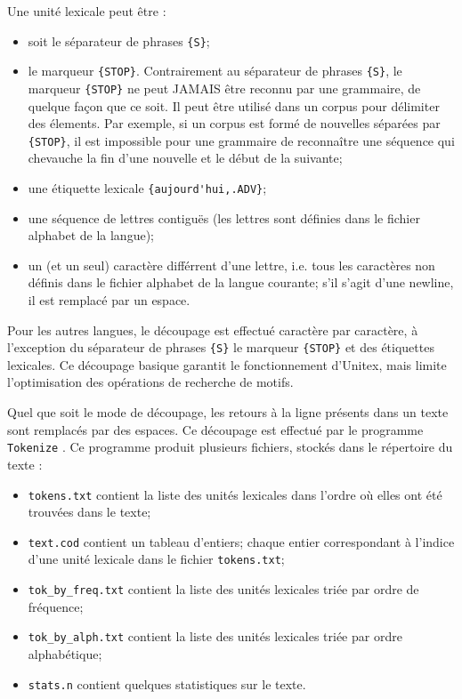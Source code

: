 \bigskip
\noindent Une unité lexicale peut être :
\begin{itemize}
  \item soit le séparateur de phrases \verb+{S}+;
  \item le marqueur \verb+{STOP}+. Contrairement au séparateur de phrases
  \verb+{S}+, le marqueur \verb+{STOP}+ ne peut JAMAIS être reconnu par une grammaire, de quelque
  façon que ce soit. Il peut être utilisé dans un corpus pour délimiter des élements. Par exemple,
  si un corpus est formé de nouvelles séparées par \verb+{STOP}+, il est impossible pour une
  grammaire de reconnaître une séquence qui chevauche la fin d'une nouvelle et le début de la
  suivante;
  \item une étiquette lexicale \verb+{aujourd'hui,.ADV}+;
  \item une séquence de lettres contiguës (les lettres sont définies dans le fichier alphabet de la
  langue);
  \item un (et un seul) caractère différrent d'une lettre, i.e. tous les caractères non définis
  dans le fichier alphabet de la langue courante; s'il s'agit d'une newline, il est remplacé par un
  espace.
\end{itemize}

\bigskip
\noindent Pour les autres langues, le découpage est effectué caractère par caractère, à l’exception
du séparateur de phrases \verb+{S}+ le marqueur \verb+{STOP}+ et des étiquettes lexicales. Ce
découpage basique garantit le fonctionnement d’Unitex, mais limite l’optimisation des opérations de
recherche de motifs.


\bigskip
\noindent Quel que soit le mode de découpage, les retours à la ligne présents
dans un texte sont remplacés par des espaces. Ce découpage est effectué par le programme
\verb+Tokenize+ .
Ce programme produit plusieurs fichiers, stockés dans le répertoire du texte :
\begin{itemize}
  \item \verb+tokens.txt+ contient la liste des unités lexicales dans l’ordre où elles ont été
  	  trouvées dans le texte;
  \item \verb+text.cod+  contient un tableau d’entiers; chaque entier correspondant à l’indice d’une
  	  unité lexicale dans le fichier \verb+tokens.txt+;
  \item \verb+tok_by_freq.txt+ contient la liste des unités lexicales triée par ordre de fréquence;
  \item \verb+tok_by_alph.txt+ contient la liste des unités lexicales triée par ordre alphabétique;
\item \verb+stats.n+ contient quelques statistiques sur le texte. 
\end{itemize}

